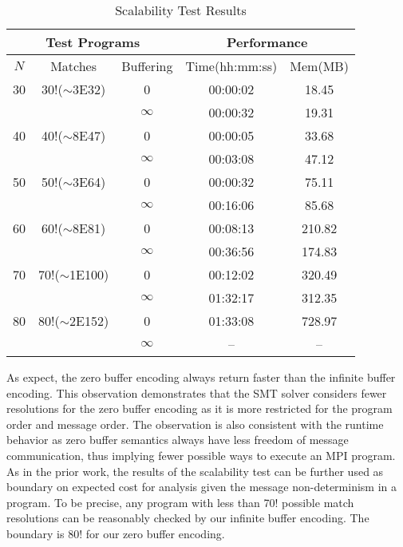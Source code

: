 \begin{table}[t]
\begin{center}
\scriptsize
\caption{Scalability Test Results}\label{table:scalability}
\begin{tabular}{|c|c|c|c|c|}
		\hline
         \multicolumn{3}{|c|}{Test Programs} & \multicolumn{2}{|c|}{Performance} \\ \hline
          $\mathit{N}$ & Matches & Buffering  & Time(hh:mm:ss) & Mem(MB) \\ \hline
          30 & 30!($\sim$3E32) & 0 & 00:00:02 & 18.45\\
               & & $\infty$ & 00:00:32 & 19.31 \\ \hline
          40 & 40!($\sim$8E47) & 0 & 00:00:05 & 33.68\\
               &  & $\infty$ & 00:03:08 & 47.12 \\ \hline
          50 & 50!($\sim$3E64) & 0 & 00:00:32 & 75.11\\
               & & $\infty$ & 00:16:06 & 85.68\\ \hline
          60 & 60!($\sim$8E81) & 0 & 00:08:13 & 210.82\\
               &  & $\infty$ & 00:36:56 & 174.83\\ \hline
          70 & 70!($\sim$1E100) & 0 & 00:12:02 & 320.49\\
               & & $\infty$ & 01:32:17 & 312.35\\ \hline
          80 & 80!($\sim$2E152) & 0 & 01:33:08 & 728.97\\
               & & $\infty$ & -- & --\\ \hline         
		\end{tabular}
\end{center}
\end{table}

As expect, the zero buffer encoding always return faster than the infinite buffer encoding. This observation demonstrates that the SMT solver considers fewer resolutions for the zero buffer encoding as it is more restricted for the program order and message order. The observation is also consistent with the runtime behavior as zero buffer semantics always have less freedom of message communication, thus implying fewer possible ways to execute an MPI program. As in the prior work, the results of the scalability test can be further used as boundary on expected cost for analysis given the message non-determinism in a program. To be precise, any program with less than 70! possible match resolutions can be reasonably checked by our infinite buffer encoding. The boundary is 80! for our zero buffer encoding.

